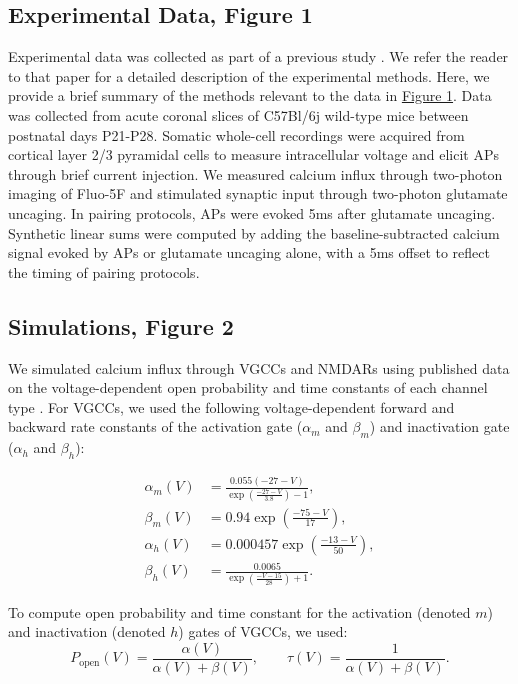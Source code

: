 \documentclass[twocolumn]{theme/bioRxiv}
\begin{document}
\subsection*{Experimental Data, Figure 1}
Experimental data was collected as part of a previous study \citep{landauDendriticBranchStructure2022}. We refer the reader to that paper for a detailed description of the experimental methods. Here, we provide a brief summary of the methods relevant to the data in \hyperref[fig:1]{Figure 1}. Data was collected from acute coronal slices of C57Bl/6j wild-type mice between postnatal days P21-P28. Somatic whole-cell recordings were acquired from cortical layer 2/3 pyramidal cells to measure intracellular voltage and elicit APs through brief current injection. We measured calcium influx through two-photon imaging of Fluo-5F and stimulated synaptic input through two-photon glutamate uncaging. In pairing protocols, APs were evoked 5ms after glutamate uncaging. Synthetic linear sums were computed by adding the baseline-subtracted calcium signal evoked by APs or glutamate uncaging alone, with a 5ms offset to reflect the timing of pairing protocols.

\subsection*{Simulations, Figure 2}
We simulated calcium influx through VGCCs and NMDARs using published data on the voltage-dependent open probability and time constants of each channel type \citep{jahrVoltageDependenceNMDAactivated1990, reuveniStepwiseRepolarizationCa21993}. For VGCCs, we used the following voltage-dependent forward and backward rate constants of the activation gate ($\alpha_m$ and $\beta_m$) and inactivation gate ($\alpha_h$ and $\beta_h$):

\begin{align*}
\alpha_m(V) &= \frac{0.055(-27 - V)}{\exp\!\left(\frac{-27 - V}{3.8}\right) - 1}, \\
\beta_m(V) &= 0.94\exp\!\left(\frac{-75 - V}{17}\right), \\
\alpha_h(V) &= 0.000457\exp\!\left(\frac{-13 - V}{50}\right), \\
\beta_h(V) &= \frac{0.0065}{\exp\!\left(\frac{-V - 15}{28}\right) + 1}.
\end{align*}

To compute open probability and time constant for the activation (denoted $m$) and inactivation (denoted $h$) gates of VGCCs, we used:
\begin{equation*}
P_{\mathrm{open}}(V) = \frac{\alpha(V)}{\alpha(V) + \beta(V)}, \qquad
\tau(V) = \frac{1}{\alpha(V) + \beta(V)}.
\end{equation*}
\end{document}
